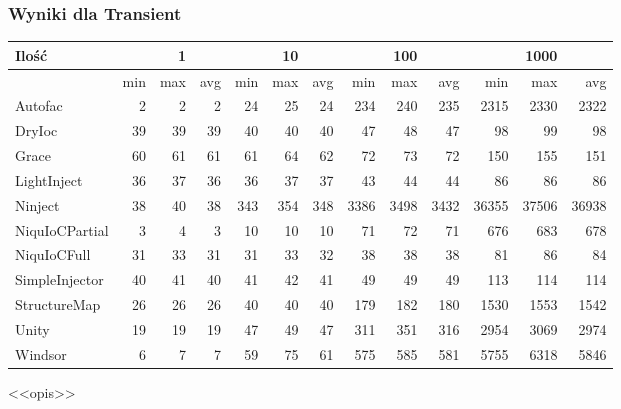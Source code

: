 \documentclass[12pt]{article}
\begin{document}
\subsubsection{Wyniki dla Transient}
\begin{center}
\begin{small}
	\begin{tabular}{ | l | r r r | r r r | r r r | r r r | }
    		\hline
     		Ilość & & 1 & & & 10 & & & 100 & & & 1000 & \\ \hline
     		 & min & max & avg & min & max & avg & min & max & avg & min & max & avg \\ \hline
    		Autofac & 2 & 2 & 2 & 24 & 25 & 24 & 234 & 240 & 235 & 2315 & 2330 & 2322 \\ \hline
		DryIoc & 39 & 39 & 39 & 40 & 40 & 40 & 47 & 48 & 47 & 98 & 99 & 98 \\ \hline
		Grace & 60 & 61 & 61 & 61 & 64 & 62 & 72 & 73 & 72 & 150 & 155 & 151 \\ \hline
		LightInject & 36 & 37 & 36 & 36 & 37 & 37 & 43 & 44 & 44 & 86 & 86 & 86 \\ \hline
		Ninject & 38 & 40 & 38 & 343 & 354 & 348 & 3386 & 3498 & 3432 & 36355 & 37506 & 36938 \\ \hline
		NiquIoCPartial & 3 & 4 & 3 & 10 & 10 & 10 & 71 & 72 & 71 & 676 & 683 & 678 \\ \hline
		NiquIoCFull & 31 & 33 & 31 & 31 & 33 & 32 & 38 & 38 & 38 & 81 & 86 & 84 \\ \hline
		SimpleInjector & 40 & 41 & 40 & 41 & 42 & 41 & 49 & 49 & 49 & 113 & 114 & 114 \\ \hline
		StructureMap & 26 & 26 & 26 & 40 & 40 & 40 & 179 & 182 & 180 & 1530 & 1553 & 1542 \\ \hline
		Unity & 19 & 19 & 19 & 47 & 49 & 47 & 311 & 351 & 316 & 2954 & 3069 & 2974 \\ \hline
		Windsor & 6 & 7 & 7 & 59 & 75 & 61 & 575 & 585 & 581 & 5755 & 6318 & 5846 \\
    		\hline
  	\end{tabular}
\end{small}
\end{center}
<<opis>>
\end{document}
